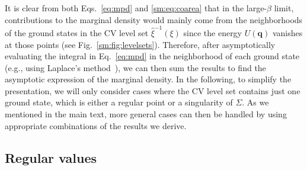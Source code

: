 It is clear from both Eqs.~\eqref{eq:mpd} and \eqref{sm:eq:coarea} that in the large-$\beta$ limit, contributions to the marginal density would mainly come from the neighborhoods of the ground states in the CV level set $\hat{\xi}^{-1}(\xi)$ since the energy $U(\bm{q})$ vanishes at those points (see Fig.~\ref{sm:fig:levelsets}).
Therefore, after asymptotically evaluating the integral in Eq.~\eqref{eq:mpd} in the neighborhood of each ground state (e.g., using Laplace's method~\cite{breitung1994}), we can then sum the results to find the asymptotic expression of the marginal density.
In the following, to simplify the presentation, we will only consider cases where the CV level set contains just one ground state, which is either a regular point or a singularity of $\Sigma$.
As we mentioned in the main text, more general cases can then be handled by using appropriate combinations of the results we derive.

\subsection{Regular values}
\label{sm:sec:regular}

